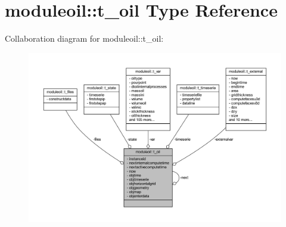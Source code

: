 \hypertarget{structmoduleoil_1_1t__oil}{}\section{moduleoil\+:\+:t\+\_\+oil Type Reference}
\label{structmoduleoil_1_1t__oil}


Collaboration diagram for moduleoil\+:\+:t\+\_\+oil\+:\nopagebreak
\begin{figure}[H]
\begin{center}
\leavevmode
\includegraphics[width=350pt]{structmoduleoil_1_1t__oil__coll__graph}
\end{center}
\end{figure}
